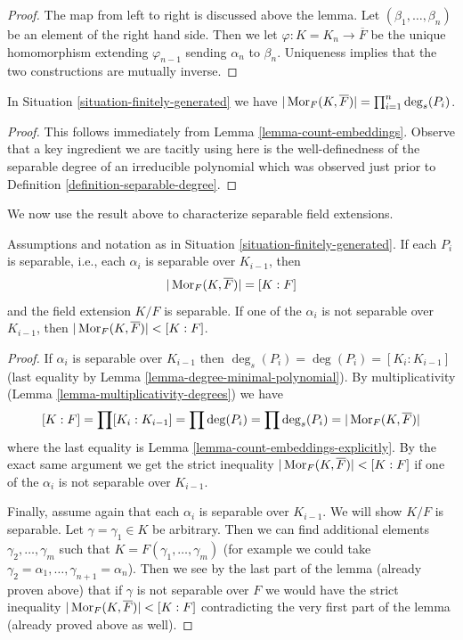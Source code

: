 \begin{proof}
The map from left to right is discussed above the lemma.
Let $(\beta_1, \ldots, \beta_n)$ be an element of the right hand side.
Then we let $\varphi : K = K_n \to \overline{F}$ be the unique homomorphism
extending $\varphi_{n - 1}$ sending $\alpha_n$ to $\beta_n$.
Uniqueness implies that the two constructions are mutually inverse.
\end{proof}

\begin{lemma}
\label{lemma-count-embeddings-explicitly}
In Situation \ref{situation-finitely-generated} we have
$|\mathop{\mathrm{Mor}}\nolimits_F(K, \overline{F})| = \prod_{i = 1}^n \deg_s(P_i)$.
\end{lemma}

\begin{proof}
This follows immediately from Lemma \ref{lemma-count-embeddings}.
Observe that a key ingredient we are tacitly using here is the
well-definedness of the separable degree of an irreducible polynomial
which was observed just prior to
Definition \ref{definition-separable-degree}.
\end{proof}

\noindent
We now use the result above to characterize separable field extensions.

\begin{lemma}
\label{lemma-separably-generated-separable}
Assumptions and notation as in Situation \ref{situation-finitely-generated}.
If each $P_i$ is separable, i.e., each $\alpha_i$ is separable over
$K_{i - 1}$, then
$$
|\mathop{\mathrm{Mor}}\nolimits_F(K, \overline{F})| = [K : F]
$$
and the field extension $K/F$ is separable. If one of the $\alpha_i$ is
not separable over $K_{i - 1}$, then
$|\mathop{\mathrm{Mor}}\nolimits_F(K, \overline{F})| < [K : F]$.
\end{lemma}

\begin{proof}
If $\alpha_i$ is separable over $K_{i - 1}$ then
$\deg_s(P_i) = \deg(P_i) = [K_i : K_{i - 1}]$
(last equality by Lemma \ref{lemma-degree-minimal-polynomial}).
By multiplicativity (Lemma \ref{lemma-multiplicativity-degrees}) we have
$$
[K : F] = \prod [K_i : K_{i - 1}] = \prod \deg(P_i) =
\prod \deg_s(P_i) = |\mathop{\mathrm{Mor}}\nolimits_F(K, \overline{F})|
$$
where the last equality is Lemma \ref{lemma-count-embeddings-explicitly}.
By the exact same argument we get the strict inequality
$|\mathop{\mathrm{Mor}}\nolimits_F(K, \overline{F})| < [K : F]$ if one of the $\alpha_i$ is
not separable over $K_{i - 1}$.

\medskip\noindent
Finally, assume again that each $\alpha_i$ is separable over $K_{i - 1}$.
We will show $K/F$ is separable.
Let $\gamma = \gamma_1 \in K$ be arbitrary. Then we can find additional
elements $\gamma_2, \ldots, \gamma_m$ such that
$K = F(\gamma_1, \ldots, \gamma_m)$ (for example we could take
$\gamma_2 = \alpha_1, \ldots, \gamma_{n + 1} = \alpha_n$).
Then we see by the last part of the lemma (already proven above)
that if $\gamma$ is not separable over $F$ we would have the
strict inequality $|\mathop{\mathrm{Mor}}\nolimits_F(K, \overline{F})| < [K : F]$
contradicting the very first part of the lemma (already proved above
as well).
\end{proof}

